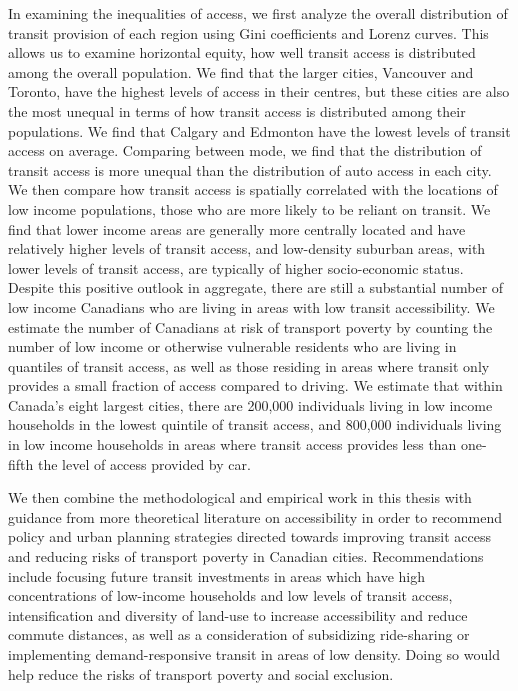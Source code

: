 \documentclass[11 pt, letterpaper]{article}
\begin{document}
{In examining the inequalities of access, we first analyze the overall distribution of transit provision of each region using Gini coefficients and Lorenz curves. This allows us to examine horizontal equity, how well transit access is distributed among the overall population. We find that the larger cities, Vancouver and Toronto, have the highest levels of access in their centres, but these cities are also the most unequal in terms of how transit access is distributed among their populations. We find that Calgary and Edmonton have the lowest levels of transit access on average. Comparing between mode, we find that the distribution of transit access is more unequal than the distribution of auto access in each city. We then compare how transit access is spatially correlated with the locations of low income populations, those who are more likely to be reliant on transit. We find that lower income areas are generally more centrally located and have relatively higher levels of transit access, and low-density suburban areas, with lower levels of transit access, are typically of higher socio-economic status. Despite this positive outlook in aggregate, there are still a substantial number of low income Canadians who are living in areas with low transit accessibility. We estimate the number of Canadians at risk of transport poverty by counting the number of low income or otherwise vulnerable residents who are living in quantiles of transit access, as well as those residing in areas where transit only provides a small fraction of access compared to driving. We estimate that within Canada's eight largest cities, there are 200,000 individuals living in low income households in the lowest quintile of transit access, and 800,000 individuals living in low income households in areas where transit access provides less than one-fifth the level of access provided by car. 

We then combine the methodological and empirical work in this thesis with guidance from more theoretical literature on accessibility in order to recommend policy and urban planning strategies directed towards improving transit access and reducing risks of transport poverty in Canadian cities. Recommendations include focusing future transit investments in areas which have high concentrations of low-income households and low levels of transit access, intensification and diversity of land-use to increase accessibility and reduce commute distances, as well as a consideration of subsidizing ride-sharing or implementing demand-responsive transit in areas of low density. Doing so would help reduce the risks of transport poverty and social exclusion.

}
\end{document}
